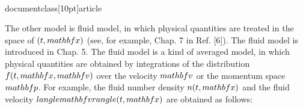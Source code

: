 \\documentclass[10pt]{article}
\begin{document}
The other model is fluid model, in which physical quantities are treated in the space of $(t, \\mathbf{x})$ (see, for example, Chap. 7 in Ref. [6]). The fluid model is introduced in Chap. 5. The fluid model is a kind of averaged model, in which physical quantities are obtained by integrations of the distribution $f(t, \\mathbf{x}, \\mathbf{v})$ over the velocity $\\mathbf{v}$ or the momentum space $\\mathbf{p}$. For example, the fluid number density $n(t, \\mathbf{x})$ and the fluid velocity $\\langle\\mathbf{v}\\rangle(t, \\mathbf{x})$ are obtained as follows:
\end{document}
